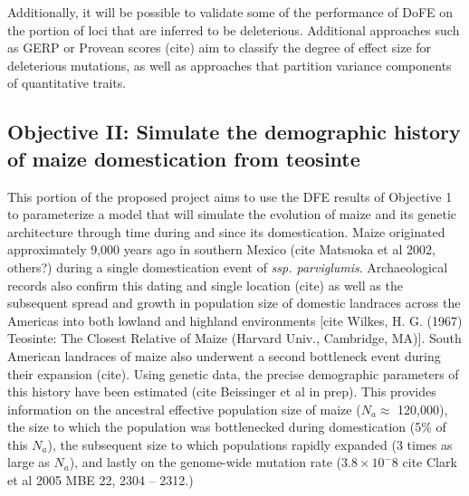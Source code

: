  Additionally, it will be possible to validate some of the performance of DoFE on the portion of loci that are inferred to be deleterious. Additional approaches such as GERP or Provean scores (cite) aim to classify the degree of effect size for deleterious mutations, as well as approaches that partition variance components of quantitative traits.
	
\subsection*{Objective II: Simulate the demographic history of maize domestication from teosinte}

 This portion of the proposed project aims to use the DFE results of Objective 1 to parameterize a model that will simulate the evolution of maize and its genetic architecture through time during and since its domestication.
Maize originated approximately 9,000 years ago in southern Mexico (cite Matsuoka et al 2002, others?) during a single domestication event of \emph{ssp. parviglumis}. Archaeological records also confirm this dating and single location (cite) as well as the subsequent spread and growth in population size of domestic landraces across the Americas into both lowland and highland environments [cite Wilkes, H. G. (1967) Teosinte: The Closest Relative of Maize (Harvard Univ., Cambridge, MA)]. South American landraces of maize also underwent a second bottleneck event during their expansion (cite). Using genetic data, the precise demographic parameters of this history have been estimated (cite Beissinger et al in prep). This provides information on the ancestral effective population size of maize ($N_a \approx$ 120,000), the size to which the population was bottlenecked during domestication (5\% of this $N_a$), the subsequent size to which populations rapidly expanded (3 times as large as $N_a$), and lastly on the genome-wide mutation rate ($3.8\times10^-8$ cite Clark et al 2005 MBE 22, 2304 -- 2312.)

